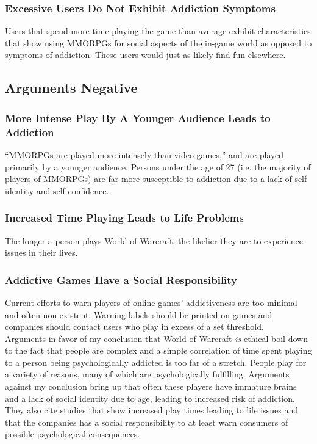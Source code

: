 \documentclass[11pt]{article}
\begin{document}
\begin{multicols}{2}
\subsubsection{Excessive Users Do Not Exhibit Addiction Symptoms}
Users that spend more time playing the game than average exhibit characteristics that show using MMORPGs for social aspects of the in-game world as opposed to symptoms of addiction. These users would just as likely find fun elsewhere. \cite{ExcessiveUseForSocialAspects}
\subsection{Arguments Negative}
\subsubsection{More Intense Play By A Younger Audience Leads to Addiction}
``MMORPGs are played more intensely than video games,'' and are played primarily by a younger audience. Persons under the age of 27 (i.e. the majority of players of MMORPGs) are far more susceptible to addiction due to a lack of self identity and self confidence. \cite{YoungerAudiencesGetAddicted}
\subsubsection{Increased Time Playing Leads to Life Problems}
The longer a person plays World of Warcraft, the likelier they are to experience issues in their lives. \cite{ProblemUsageAmongHighlyEngagedPlayers}
\subsubsection{Addictive Games Have a Social Responsibility}
Current efforts to warn players of online games' addictiveness are too minimal and often non-existent. Warning labels should be printed on games and companies should contact users who play in excess of a set threshold. \cite{MMORPGSocialResponsibility}\\

Arguments in favor of my conclusion that World of Warcraft \emph{is} ethical boil down to the fact that people are complex and a simple correlation of time spent playing to a person being psychologically addicted is too far of a stretch. People play for a variety of reasons, many of which are psychologically fulfilling. Arguments against my conclusion bring up that often these players have immature brains and a lack of social identity due to age, leading to increased risk of addiction. They also cite studies that show increased play times leading to life issues and that the companies has a social responsibility to at least warn consumers of possible psychological consequences.


\end{multicols}
\end{document}
